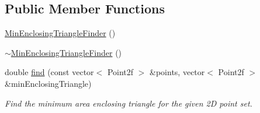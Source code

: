 \subsection*{Public Member Functions}
\begin{DoxyCompactItemize}
\item 
\hyperlink{classmultiscale_1_1MinEnclosingTriangleFinder_a9bac0668e32bcab3f35ddc81fea40940}{Min\-Enclosing\-Triangle\-Finder} ()
\item 
\hyperlink{classmultiscale_1_1MinEnclosingTriangleFinder_a356eccb6cce71d00144007df0bee1e5e}{$\sim$\-Min\-Enclosing\-Triangle\-Finder} ()
\item 
double \hyperlink{classmultiscale_1_1MinEnclosingTriangleFinder_afe74965c39261feb7152f5556c0281cd}{find} (const vector$<$ Point2f $>$ \&points, vector$<$ Point2f $>$ \&min\-Enclosing\-Triangle)
\begin{DoxyCompactList}\small\item\em Find the minimum area enclosing triangle for the given 2\-D point set. \end{DoxyCompactList}\end{DoxyCompactItemize}
